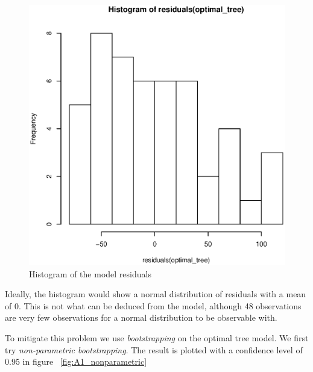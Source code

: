 \documentclass[a4paper,12pt]{article}
\begin{document}
    \begin{figure}[H]

    \centering
    \includegraphics[width=\textwidth]{figures/A1_historgram_residuals}  
    \caption{Histogram of the model residuals \label{fig:A1_historgram_residuals}}
    \end{figure}
    Ideally, the histogram would show a normal distribution of residuals with a mean of 0. This is not what can be deduced from the model, although 48 observations are very few observations for a normal distribution to be observable with.

    To mitigate this problem we use \textit{bootstrapping} on the optimal tree model. We first try \textit{non-parametric bootstrapping}. The result is plotted with a confidence level of 0.95 in figure ~\ref{fig:A1_nonparametric}
\end{document}
